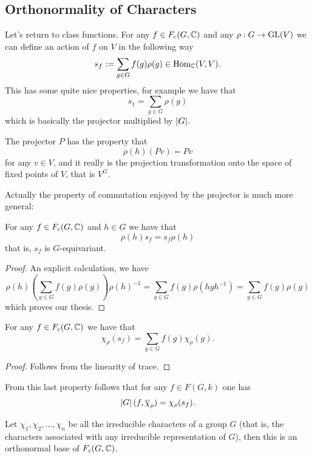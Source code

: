 \documentclass[11pt]{scrartcl}
\begin{document}
	\subsection{Orthonormality of Characters}
	
	Let's return to class functions. For any $f\in F_c(G,\mathbb C)$ and any $\rho:G\to\operatorname{GL}(V)$ we can define an action of $f$ on $V$ in the following way
	$$s_f:=\sum_{g\in G}f(g)\rho(g)\in \text{Hom}_\mathbb C(V,V).$$
	This has some quite nice properties, for example we have that
	$$s_1=\sum_{g\in G}\rho(g)$$
	which is basically the projector multiplied by $\left\lvert G \right\rvert$. 
	\begin{remark}
		The projector $P$ has the property that 
		$$\rho(h)(Pv)=Pv$$
		for any $v\in V$, and it really is the projection transformation onto the space of fixed points of $V$, that is $V^G$.
	\end{remark}
	Actually the property of commutation enjoyed by the projector is much more general:
	\begin{lemma}
		For any $f\in F_c(G,\mathbb C)$ and $h\in G$ we have that
		$$\rho(h)s_f=s_f\rho(h)$$
		that is, $s_f$ is $G$-equivariant.
	\end{lemma}
	\begin{proof}
		An explicit calculation, we have
		$$\rho(h)\left(\sum_{g\in G}f(g)\rho(g)\right)\rho(h)^{-1}=\sum_{g\in G}f(g)\rho(hgh^{-1})=\sum_{g\in G}f(g)\rho(g)$$
		which proves our thesis.
	\end{proof}
	\begin{proposition}
		For any $f\in F_c(G,\mathbb C)$ we have that
		$$\chi_\rho(s_f)=\sum_{g\in G}f(g)\chi_\rho(g).$$
	\end{proposition}
	\begin{proof}
		Follows from the linearity of trace.
	\end{proof}
	From this last property follows that for any $f\in F(G,k)$ one has
	$$\left\lvert G \right\rvert(f,\overline{\chi}_\rho)=\chi_\rho(s_f).$$
	\begin{theorem}
		Let $\chi_1,\chi_2,\dots,\chi_n$ be all the irreducible characters of a group $G$ (that is, the characters associated with any irreducible representation of $G$), then this is an orthonormal base of $F_c(G,\mathbb C)$.
	\end{theorem}
\end{document}
